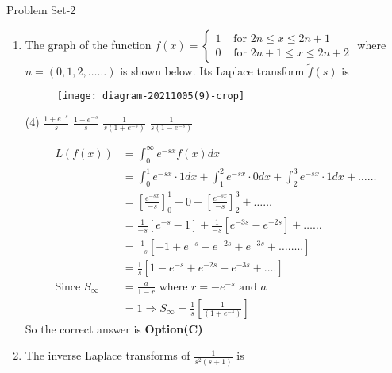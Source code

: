 \newpage
\begin{abox}
	Problem Set-2
\end{abox}
\begin{enumerate}
	\item The graph of the function $f(x)=\left\{\begin{array}{ll}1 & \text { for } 2 n \leq x \leq 2 n+1 \\ 0 & \text { for } 2 n+1 \leq x \leq 2 n+2\end{array}\right.$ where $n=(0,1,2, \ldots \ldots)$ is shown below. Its Laplace transform $\tilde{f}(s)$ is
	{	}
	
	\begin{figure}[H]
		\centering
		\texttt{[image: diagram-20211005(9)-crop]}
	\end{figure}
	\begin{tasks}(4)
		\task[\textbf{A.}] $\frac{1+e^{-s}}{s}$
		\task[\textbf{B.}] $\frac{1-e^{-s}}{s}$
		\task[\textbf{C.}] $\frac{1}{s\left(1+e^{-s}\right)}$
		\task[\textbf{D.}]  $\frac{1}{s\left(1-e^{-s}\right)}$
	\end{tasks}
	\begin{answer}
		\begin{align*}
		L(f(x))&=\int_{0}^{\infty} e^{-s x} f(x) d x\\&=\int_{0}^{1} e^{-s x} \cdot 1 d x+\int_{1}^{2} e^{-s x} \cdot 0 d x+\int_{2}^{3} e^{-s x} \cdot 1 d x+\ldots \ldots\\
		&=\left[\frac{e^{-s x}}{-s}\right]_{0}^{1}+0+\left[\frac{e^{-s x}}{-s}\right]_{2}^{3}+\ldots \ldots\\&=\frac{1}{-s}\left[e^{-s}-1\right]+\frac{1}{-s}\left[e^{-3 s}-e^{-2 s}\right]+\ldots \ldots\\
		&=\frac{1}{-s}\left[-1+e^{-s}-e^{-2 s}+e^{-3 s}+\ldots \ldots . .\right]\\&=\frac{1}{s}\left[1-e^{-s}+e^{-2 s}-e^{-3 s}+\ldots .\right]\\
		\text{Since }S_{\infty}&=\frac{a}{1-r}\text{ where }r=-e^{-s}\text{ and }a\\&=1 \Rightarrow S_{\infty}=\frac{1}{s}\left[\frac{1}{\left(1+e^{-s}\right)}\right]
		\end{align*}
		So the correct answer is \textbf{Option(C)}
	\end{answer}
	\item The inverse Laplace transforms of $\frac{1}{s^{2}(s+1)}$ is
	{}
	

\end{enumerate}
